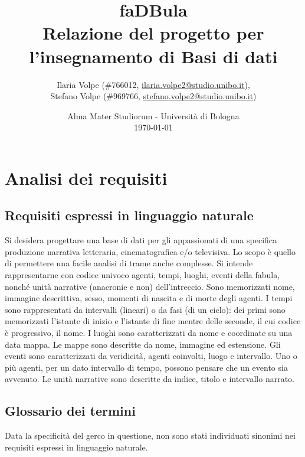 \documentclass{article}
\title{
	faDBula \\
	\textbf{\large
		Relazione del progetto per l'insegnamento di \break
		Basi di dati
	}
}
\author{
	Ilaria Volpe (\#766012,
	\href{mailto:ilaria.volpe2@studio.unibo.it}{ilaria.volpe2@studio.unibo.it}),
	\\
	Stefano Volpe (\#969766,
	\href{mailto:stefano.volpe2@studio.unibo.it}{stefano.volpe2@studio.unibo.it})
}
\date{
	Alma Mater Studiorum - Universit\`a di Bologna \\
	\today
}
\begin{document}
\maketitle
\thispagestyle{empty}
\pagebreak
\tableofcontents

\section{Analisi dei requisiti}

\subsection{Requisiti espressi in linguaggio naturale}

Si desidera progettare una base di dati per gli appassionati di una specifica
produzione narrativa letteraria, cinematografica e/o televisiva. Lo scopo è
quello di permettere una facile analisi di trame anche complesse. Si intende
rappresentarne con codice univoco agenti, tempi, luoghi, eventi della fabula,
nonché unità narrative (anacronie e non) dell'intreccio. Sono memorizzati nome,
immagine descrittiva, sesso, momenti di nascita e di morte degli agenti. I
tempi sono rappresentati da intervalli (lineari) o da fasi (di un ciclo): dei
primi sono memorizzati l'istante di inizio e l'istante di fine mentre delle
seconde, il cui codice è progressivo, il nome. I luoghi sono caratterizzati da
nome e coordinate su una data mappa. Le mappe sono descritte da nome, immagine
ed estensione. Gli eventi sono caratterizzati da veridicità, agenti coinvolti,
luogo e intervallo. Uno o più agenti, per un dato intervallo di tempo, possono
pensare che un evento sia avvenuto. Le unità narrative sono descritte da indice,
titolo e intervallo narrato.

\subsection{Glossario dei termini}

Data la specificità del gerco in questione, non sono stati individuati sinonimi
nei requisiti espressi in linguaggio naturale.
\end{document}
